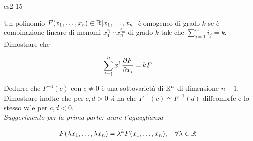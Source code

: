 {es2-15}
{
Un polinomio $ F(x_{1},\dots,x_{n}) \in \mathbb{R}[x_{1},\dots,x_{n}] $ è omogeneo di grado $ k $ se è combinazione lineare di monomi $ x_{1}^{i_{1}} \cdots x_{n}^{i_{m}} $ di grado $ k $ tale che $ \sum_{j=1}^{m} i_{j} = k $. Dimostrare che

\begin{equation}
	\sum_{i=1}^{n} x^{i} \, \pdv{F}{x_{i}} = k F
\end{equation}

Dedurre che $ F^{-1}(c) $ con $ c \neq 0 $ è una sottovarietà di $ \mathbb{R}^{n} $ di dimensione $ n-1 $. Dimostrare inoltre che per $ c,d>0 $ si ha che $ F^{-1}(c) \simeq F^{-1}(d) $ diffeomorfe e lo stesso vale per $ c,d<0 $. \\
\textit{Suggerimento per la prima parte: usare l'uguaglianza}

\begin{equation}
	F(\lambda x_{1},\dots,\lambda x_{n}) = \lambda^{k} F(x_{1},\dots,x_{n}) %
	\qcomma \forall \lambda \in \R
\end{equation}
}
